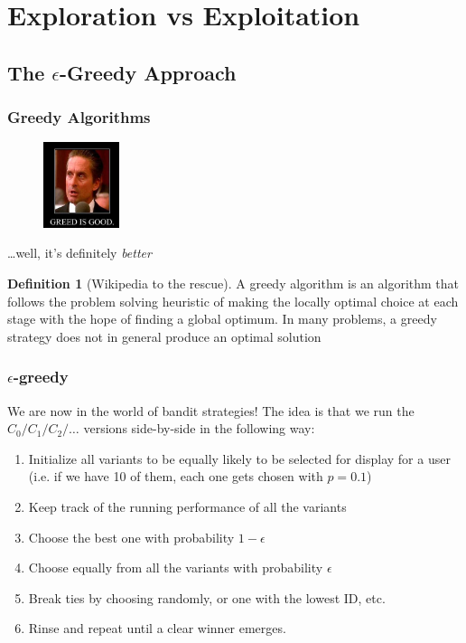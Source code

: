 \documentclass[]{beamer}
\theoremstyle{definition}
\newtheorem{defn}{Definition}[section]
\begin{document}
\section{Exploration vs Exploitation}
\subsection{The $\epsilon$-Greedy Approach}
\begin{frame}
\frametitle{Greedy Algorithms}
\begin{figure}[h!]
\centering
	\includegraphics[height=2.5cm]{resources/greedisgood.png}
\end{figure}	
\ldots well, it's definitely \emph{better}
\begin{defn}[Wikipedia to the rescue]
A greedy algorithm is an algorithm that follows the problem solving heuristic of making the locally optimal choice at each stage with the hope of finding a global optimum. In many problems, a greedy strategy does not in general produce an optimal solution
\end{defn}
\end{frame}


\begin{frame}
\frametitle{$\epsilon$-greedy}
We are now in the world of bandit strategies!  The idea is that we run the $C_0/C_1/C_2/\ldots$ versions side-by-side in the following way:
\begin{enumerate}
\item Initialize all variants to be equally likely to be selected for display for a user (i.e. if we have 10 of them, each one gets chosen with $p = 0.1$)
\item Keep track of the running performance of all the variants 
\item Choose the best one with probability $1 - \epsilon$
\item Choose equally from all the variants with probability $\epsilon$
\item Break ties by choosing randomly, or one with the lowest ID, etc.
\item Rinse and repeat until a clear winner emerges.
\end{enumerate}
\end{frame}
\end{document}
